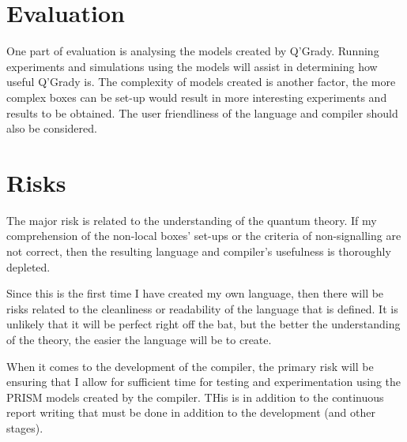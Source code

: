 \documentclass[11pt, a4paper]{article}
\begin{document}
\section{Evaluation} %
\label{sec:evaluation}
One part of evaluation is analysing the models created by Q'Grady. Running
experiments and simulations using the models will assist in determining how
useful Q'Grady is. The complexity of models created is another factor, the more
complex boxes can be set-up would result in more interesting experiments and
results to be obtained. The user friendliness of the language and compiler
should also be considered.

\section{Risks} %
\label{sec:risks}
The major risk is related to the understanding of the quantum theory. If my 
comprehension of the non-local boxes' set-ups or the criteria of non-signalling
are not correct, then the resulting language and compiler's usefulness is
thoroughly depleted.

Since this is the first time I have created my own language, then there will be
risks related to the cleanliness or readability of the language that is defined.
It is unlikely that it will be perfect right off the bat, but the better the
understanding of the theory, the easier the language will be to create.

When it comes to the development of the compiler, the primary risk will be
ensuring that I allow for sufficient time for testing and experimentation using
the PRISM models created by the compiler. THis is in addition to the continuous
report writing that must be done in addition to the development (and other
stages).
\end{document}
